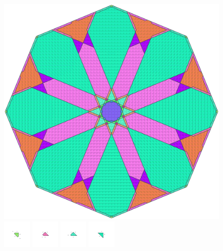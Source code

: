 \documentclass[text.tex]{subfiles}
\begin{document}
\clearpage
\pagestyle{fancy}
\fancyhf{}
\begin{figure}[h!]
\centering
\includegraphics[width=1\textwidth]{img/results/octagon/octagon_222487_(-8_7alpha_4).pdf}
\includegraphics[width=0.12\textwidth]{img/results/octagon/octagon_222487_(-8_7alpha_4)_001.pdf}
\includegraphics[width=0.12\textwidth]{img/results/octagon/octagon_222487_(-8_7alpha_4)_002.pdf}
\includegraphics[width=0.12\textwidth]{img/results/octagon/octagon_222487_(-8_7alpha_4)_003.pdf}
\includegraphics[width=0.12\textwidth]{img/results/octagon/octagon_222487_(-8_7alpha_4)_004.pdf}

\end{figure}
\end{document}
